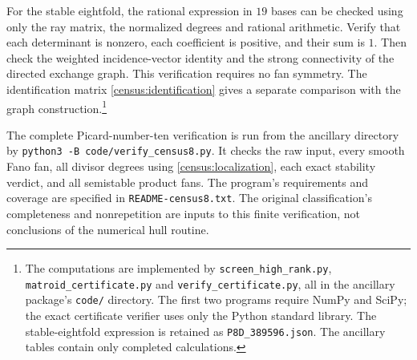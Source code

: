 For the stable eightfold, the rational expression in $19$ bases can be
checked using only the ray matrix, the normalized degrees and rational
arithmetic. Verify that each determinant is nonzero, each coefficient is
positive, and their sum is $1$. Then check the weighted incidence-vector
identity and the strong connectivity of the directed exchange graph.
This verification requires no fan symmetry. The identification matrix
\eqref{census:identification} gives a separate comparison with the graph construction.\footnote{\raggedright The
computations are implemented by \texttt{screen\_high\_rank.py},
\texttt{matroid\_certificate.py} and \texttt{verify\_certificate.py},
all in the ancillary package's \texttt{code/} directory.
The first two programs require NumPy and SciPy; the exact certificate
verifier uses only the Python standard library.
The stable-eightfold expression is retained as
\texttt{P8D\_389596.json}. The ancillary tables contain only completed
calculations.}

The complete Picard-number-ten verification is run from the ancillary
directory by \texttt{python3 -B code/verify\_census8.py}. It checks the
raw input, every smooth Fano fan, all divisor degrees using
\eqref{census:localization}, each exact stability verdict, and all
semistable product fans. The program's requirements and coverage are
specified in \texttt{README-census8.txt}. The original classification's
completeness and nonrepetition are inputs to this finite verification,
not conclusions of the numerical hull routine.
